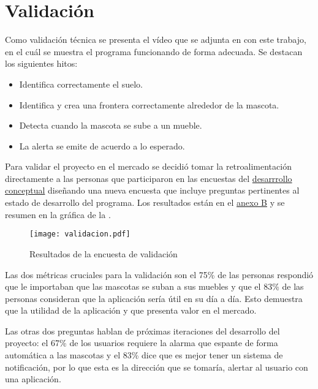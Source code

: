 \section{Validación}

\label{sec:validacion}

Como validación técnica se presenta el vídeo que se adjunta en con este trabajo, en el cuál se muestra el programa funcionando de forma adecuada. Se destacan los siguientes hitos:

\begin{itemize}
    \item Identifica correctamente el suelo.
    \item Identifica y crea una frontera correctamente alrededor de la mascota.
    \item Detecta cuando la mascota se sube a un mueble.
    \item La alerta se emite de acuerdo a lo esperado.
\end{itemize}


Para validar el proyecto  en el mercado se decidió tomar la retroalimentación directamente a las personas que participaron en las encuestas del \hyperref[sec:desarrolloconceptual]{desarrrollo conceptual} diseñando una nueva encuesta que incluye preguntas pertinentes al estado de desarrollo del programa. Los resultados están en el \hyperref[ape:anexo_validacion]{anexo B} y se resumen en la gráfica de la . 


\begin{figure}
    \centering
    \caption[Validación]{Resultados de la encuesta de validación}
    \label{fig:validacion}
    \texttt{[image: validacion.pdf]}
  \end{figure}

Las dos métricas cruciales para la validación son el 75\% de las personas respondió que le importaban que las mascotas se suban a sus muebles y que el 
83\% de las personas consideran que la aplicación sería útil en su día a día. Esto demuestra que la utilidad de la aplicación y que presenta valor en el mercado. 


Las otras dos preguntas hablan de próximas iteraciones del desarrollo del proyecto: el 67\% de los usuarios requiere la alarma que espante de forma automática a las mascotas y el 83\% dice que es mejor tener un sistema de notificación, por lo que esta es la dirección que se tomaría, alertar al usuario con una aplicación.